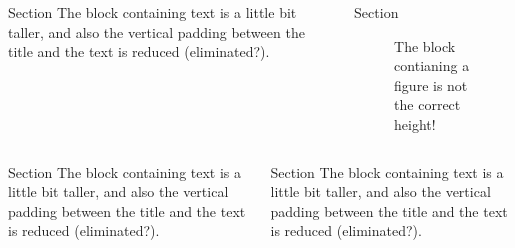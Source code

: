 \documentclass[t]{beamer}
\begin{document}
\begin{frame}{}

    \begin{columns}[T, totalwidth=\textwidth]
        \begin{column}{.49\linewidth}
            \begin{block}{Section}
            The block containing text is a little bit taller, and also the vertical padding between the title and the text is reduced (eliminated?).
          \end{block}
        \end{column}
        \begin{column}{.49\linewidth}
            \begin{block}{Section}
              \begin{figure}[H]
                \vspace{60ex}
                \caption{The block contianing a figure is not the correct height!}
            \end{figure}
          \end{block}
        \end{column}
    \end{columns}

    \begin{columns}[T, totalwidth=\textwidth]
        \begin{column}{.49\linewidth}
            \begin{block}{Section}
                The block containing text is a little bit taller, and also the vertical padding between the title and the text is reduced (eliminated?).
            \end{block}
        \end{column}
        \begin{column}{.49\linewidth}
            \begin{block}{Section}
                The block containing text is a little bit taller, and also the vertical padding between the title and the text is reduced (eliminated?).
            \end{block}
        \end{column}
    \end{columns}
\end{frame}
\end{document}
